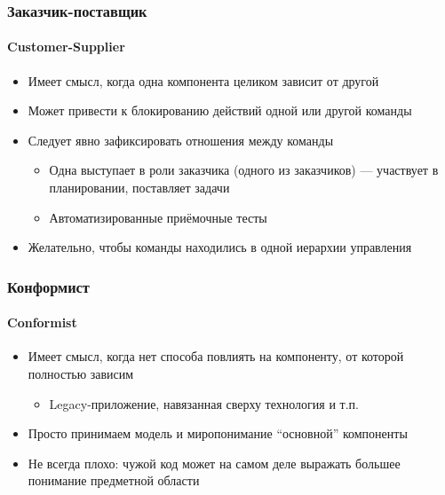 \documentclass[xetex,mathserif,serif]{beamer}
\begin{document}
	\begin{frame}
		\frametitle{Заказчик-поставщик}
		\framesubtitle{Customer-Supplier}
		\begin{itemize}
			\item Имеет смысл, когда одна компонента целиком зависит от другой
			\item Может привести к блокированию действий одной или другой команды
			\item Следует явно зафиксировать отношения между команды
			\begin{itemize}
				\item Одна выступает в роли заказчика (одного из заказчиков) --- участвует в планировании, поставляет задачи
				\item Автоматизированные приёмочные тесты
			\end{itemize}
			\item Желательно, чтобы команды находились в одной иерархии управления
		\end{itemize}
	\end{frame}

	\begin{frame}
		\frametitle{Конформист}
		\framesubtitle{Conformist}
		\begin{itemize}
			\item Имеет смысл, когда нет способа повлиять на компоненту, от которой полностью зависим
			\begin{itemize}
				\item Legacy-приложение, навязанная сверху технология и т.п.
			\end{itemize}
			\item Просто принимаем модель и миропонимание ``основной'' компоненты
			\item Не всегда плохо: чужой код может на самом деле выражать большее понимание предметной области
		\end{itemize}
	\end{frame}
\end{document}
